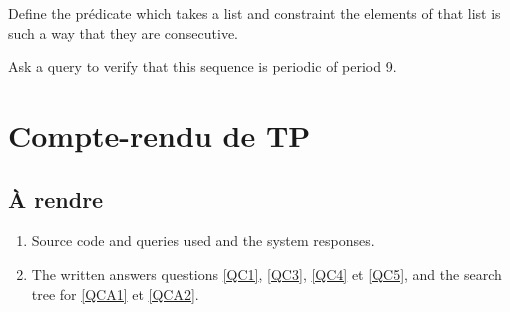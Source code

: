 \begin{question}
Define the prédicate  which takes a list and constraint the elements of that list is such a way that they are consecutive.
\end{question}

\begin{question} 
Ask a query to verify that this sequence is periodic of period 9.
\end{question}


\section{Compte-rendu de TP}

\subsection{À rendre}

\begin{enumerate}
\item Source code \eclipse{} and queries \eclipse{}
  used and the system responses.
\item The written answers questions \ref{QC1}, \ref{QC3},
  \ref{QC4} et \ref{QC5}, and the search tree for \ref{QCA1} et \ref{QCA2}.
\end{enumerate}



